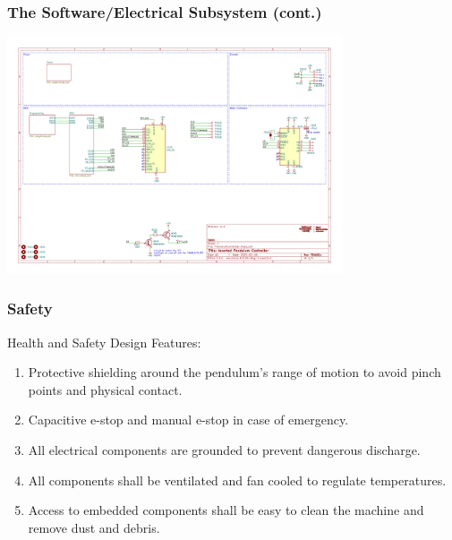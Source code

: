 \documentclass[aspectratio=169]{beamer}
\begin{document}
\begin{frame}
    \frametitle{The Software/Electrical Subsystem (cont.)}

    \includegraphics[height=7cm]{Schematic}

\end{frame}

\begin{frame}
    \frametitle{Safety}

    Health and Safety Design Features:
    \begin{enumerate}
        \item Protective shielding around the pendulum’s range of motion to avoid pinch points and physical contact.
        \item Capacitive e-stop and manual e-stop in case of emergency.
        \item All electrical components are grounded to prevent dangerous discharge.
        \item All components shall be ventilated and fan cooled to regulate temperatures.
        \item Access to embedded components shall be easy to clean the machine and remove dust and debris.
    \end{enumerate}

\end{frame}
\end{document}
